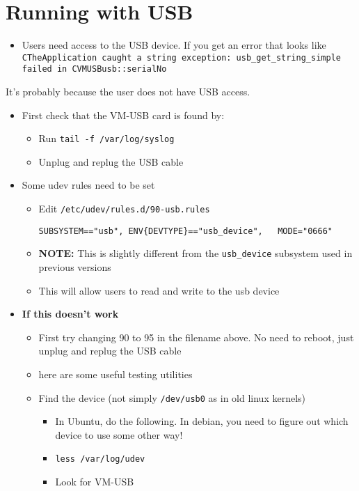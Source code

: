 \documentclass[11pt]{article}
\begin{document}
\section*{Running with USB}
\label{sec-10}
\begin{itemize}
\item Users need access to the USB device. If you get an error that
looks like\\
    \verb~CTheApplication caught a string exception: usb_get_string_simple failed in CVMUSBusb::serialNo~\\
\end{itemize}
It's probably because the user does not have USB access.
\begin{itemize}
\item First check that the VM-USB card is found by:
\begin{itemize}
\item Run \verb~tail -f /var/log/syslog~
\item Unplug and replug the USB cable
\end{itemize}
\item Some udev rules need to be set
\begin{itemize}
\item Edit \verb~/etc/udev/rules.d/90-usb.rules~
\begin{verbatim}
SUBSYSTEM=="usb", ENV{DEVTYPE}=="usb_device",   MODE="0666"
\end{verbatim}
\item \textbf{NOTE:} This is slightly different from the \verb~usb_device~
subsystem used in previous versions
\item This will allow users to read and write to the usb device
\end{itemize}
\item \textbf{If this doesn't work}
\begin{itemize}
\item First try changing 90 to 95 in the filename above. No need to
reboot, just unplug and replug the USB cable
\item here are some useful testing utilities
\item Find the device (not simply \verb~/dev/usb0~ as in old linux kernels)
\begin{itemize}
\item In Ubuntu, do the following. In debian, you need to figure 
out which device to use some other way!
\item \verb~less /var/log/udev~
\item Look for VM-USB

\end{itemize}
\end{itemize}
\end{itemize}
\end{document}
